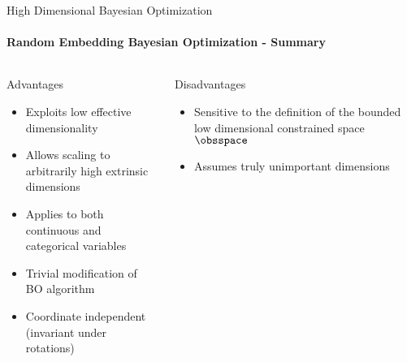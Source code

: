 \begin{frame}[c]{High Dimensional Bayesian Optimization}
\framesubtitle{Random Embedding Bayesian Optimization - Summary}
\begin{columns}[T] %
\begin{column}{.48\textwidth}


    \begin{block}{Advantages}
    \begin{itemize}
    	\item Exploits low effective dimensionality 
    	\item Allows scaling to arbitrarily high extrinsic dimensions
    	\item Applies to both continuous and categorical variables
    	\item Trivial modification of BO algorithm
    	\item Coordinate independent (invariant under rotations)
    \end{itemize}
    \end{block}
\pause
\end{column}%

\hfill%

\begin{column}{.48\textwidth}

    \begin{block}{Disadvantages}
    \begin{itemize}
    	\item Sensitive to the definition of the bounded low dimensional constrained space $\obsspace$
    	\item Assumes truly unimportant dimensions
    \end{itemize}
\end{block}

\end{column}
\end{columns}   
\end{frame}

